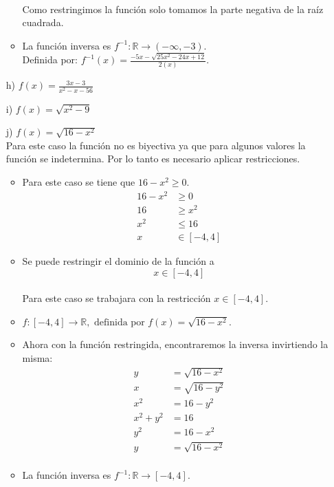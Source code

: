 \documentclass{templateNote}
\begin{document}
\begin{itemize}
\begin{itemize}
\begin{align*}
        \end{align*}
        Como restringimos la función solo tomamos la parte negativa de la raíz cuadrada.
        \item La función inversa es $f^{-1}: \mathbb{R} \rightarrow (-\infty, -3)$.
        \\Definida por: $f^{-1}(x) = \frac{-5x - \sqrt{25x^2 - 24x + 12}}{2(x)}$.
    \end{itemize}
    \item[h)] $f(x) = \frac{3x - 3}{x^2 - x - 56}$
    \item[i)] $f(x) = \sqrt{x^2 - 9}$
    \item[j)] $f(x) = \sqrt{16 - x^2}$
    \\
    Para este caso la función no es biyectiva ya que para algunos valores la función se indetermina. Por lo tanto es necesario aplicar restricciones.\\
    \begin{itemize}
        \item Para este caso se tiene que $16 - x^2 \geq 0$.
        \begin{align*}
            16 - x^2 &\geq 0 \\
            16 &\geq x^2 \\
            x^2 &\leq 16 \\
            x &\in [-4, 4]
        \end{align*}
        \item Se puede restringir el dominio de la función a \\ \[x \in [-4, 4] \] \\Para este caso se trabajara con la restricción $x \in [-4, 4]$.
        \item $f:[-4, 4] \rightarrow \mathbb{R}, \text{ definida por } f(x) = \sqrt{16 - x^2}$.
        \item Ahora con la función restringida, encontraremos la inversa invirtiendo la misma:
        \begin{align*}
            y &= \sqrt{16 - x^2} \\
            x &= \sqrt{16 - y^2} \\
            x^2 &= 16 - y^2 \\
            x^2 + y^2 &= 16 \\
            y^2 &= 16 - x^2 \\
            y &= \sqrt{16 - x^2} \\
        \end{align*}
        \item La función inversa es $f^{-1}: \mathbb{R} \rightarrow [-4, 4]$.

\end{itemize}
\end{itemize}
\end{document}

